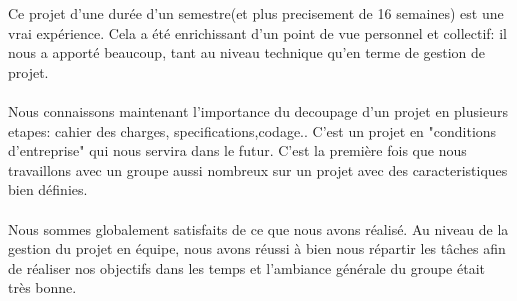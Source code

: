 \documentclass[a4]{article}
\begin{document}
Ce projet d'une durée d'un semestre(et plus precisement de 16 semaines) est une vrai expérience.
Cela a été enrichissant d'un point de vue personnel et collectif:
il nous a apporté beaucoup, tant au
niveau technique qu’en terme de gestion de projet.  \\  \\
Nous connaissons maintenant l'importance du decoupage d'un projet en plusieurs etapes: cahier des charges, specifications,codage..
C'est un projet en "conditions d'entreprise" qui nous servira dans le futur.
C’est la première fois que nous travaillons avec un groupe aussi nombreux sur un projet avec des caracteristiques bien définies. \\ \\
Nous sommes globalement satisfaits de ce que nous avons réalisé.
 Au niveau de la gestion du projet en équipe, nous avons réussi à bien nous répartir les
tâches afin de réaliser nos objectifs dans les temps et l'ambiance générale du groupe était très
bonne. \\ \\ \\





	
	
	
\end{document}
